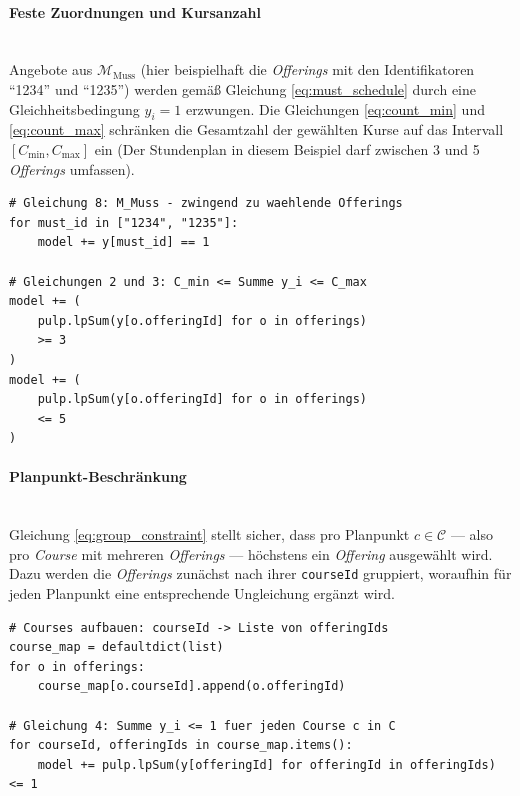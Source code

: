 \newpage


\paragraph{Feste Zuordnungen und Kursanzahl}\hfill\\

Angebote aus $\mathcal{M}_{\text{Muss}}$ (hier beispielhaft die \textit{Offerings} mit den Identifikatoren \enquote{1234} und \enquote{1235}) werden gemäß
Gleichung \ref{eq:must_schedule} durch eine Gleichheitsbedingung $y_i = 1$ erzwungen.
Die Gleichungen \ref{eq:count_min} und \ref{eq:count_max} schränken die Gesamtzahl der gewählten
Kurse auf das Intervall $[C_{\min}, C_{\max}]$ ein (Der Stundenplan in diesem Beispiel darf zwischen 3 und 5 \textit{Offerings} umfassen).

\begin{lstlisting}[caption={Feste Zuordnungen und Kursanzahl},
                   label={lst:count}]
# Gleichung 8: M_Muss - zwingend zu waehlende Offerings
for must_id in ["1234", "1235"]:
    model += y[must_id] == 1
 
# Gleichungen 2 und 3: C_min <= Summe y_i <= C_max
model += (
    pulp.lpSum(y[o.offeringId] for o in offerings)
    >= 3
)
model += (
    pulp.lpSum(y[o.offeringId] for o in offerings)
    <= 5
)
\end{lstlisting}



\paragraph{Planpunkt-Beschränkung}\hfill\\

Gleichung \ref{eq:group_constraint} stellt sicher, dass pro Planpunkt $c \in \mathcal{C}$ --- also pro \textit{Course} mit mehreren \textit{Offerings} --- höchstens ein \textit{Offering} ausgewählt wird. Dazu werden die \textit{Offerings} zunächst nach ihrer \texttt{courseId} gruppiert, woraufhin für jeden Planpunkt eine entsprechende Ungleichung ergänzt wird.

\begin{lstlisting}[caption={Gruppen-Beschränkung},
                   label={lst:group}]
# Courses aufbauen: courseId -> Liste von offeringIds
course_map = defaultdict(list)
for o in offerings:
    course_map[o.courseId].append(o.offeringId)
 
# Gleichung 4: Summe y_i <= 1 fuer jeden Course c in C
for courseId, offeringIds in course_map.items():
    model += pulp.lpSum(y[offeringId] for offeringId in offeringIds) <= 1
\end{lstlisting}



